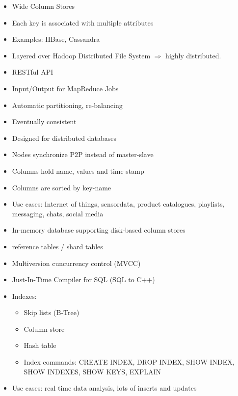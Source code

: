 \begin{breakbox}
\begin{itemize}
	\item Wide Column Stores
	\item Each key is associated with multiple attributes
	\item Examples: HBase, Cassandra
\end{itemize}
\end{breakbox}

\begin{breakbox}
\begin{itemize}
	\item Layered over Hadoop Distributed File System $\Rightarrow$ highly distributed.
	\item RESTful API
	\item Input/Output for MapReduce Jobs
	\item Automatic partitioning, re-balancing
\end{itemize}
\end{breakbox}

\begin{breakbox}
\begin{itemize}
	\item Eventually consistent
	\item Designed for distributed databases
	\item Nodes synchronize P2P instead of master-slave
	\item Columns hold name, values and time stamp
	\item Columns are sorted by key-name
	\item Use cases: Internet of things, sensordata, product catalogues, playlists, messaging, chats, social media
\end{itemize}
\end{breakbox}

\begin{breakbox}
\begin{itemize}
	\item In-memory database supporting disk-based column stores
	\item reference tables / shard tables
	\item Multiversion cuncurrency control (MVCC)
	\item Just-In-Time Compiler for SQL (SQL to C++)
	\item Indexes:
		\begin{itemize}
			\item Skip lists (B-Tree)
			\item Column store
			\item Hash table
			\item Index commands: CREATE INDEX, DROP INDEX, SHOW INDEX, SHOW INDEXES, SHOW KEYS, EXPLAIN
		\end{itemize}
	\item Use cases: real time data analysis, lots of inserts and updates
\end{itemize}
\end{breakbox}

